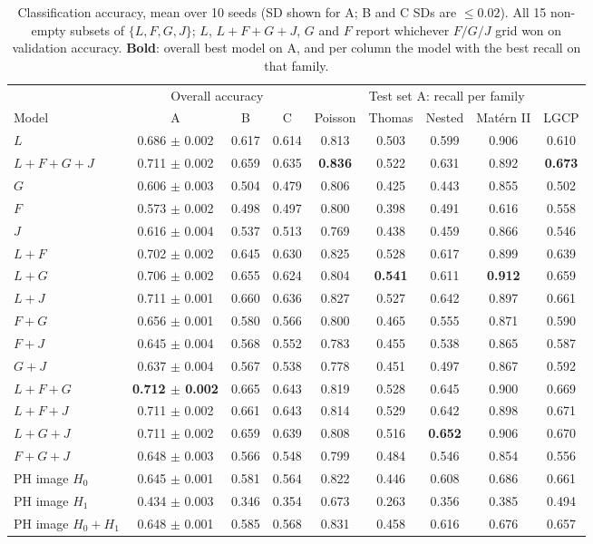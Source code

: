 \documentclass[10pt,a4paper]{article}
\newcommand{\B}[1]{\textbf{#1}}
\begin{document}
\begin{table}[ht]
\centering\footnotesize
\begin{tabular}{@{}l ccc ccccc@{}}
\toprule
 & \multicolumn{3}{c}{Overall accuracy} & \multicolumn{5}{c}{Test set A: recall per family}\\
\cmidrule(lr){2-4}\cmidrule(l){5-9}
Model & A & B & C & Poisson & Thomas & Nested & Mat\'ern II & LGCP\\
\midrule
$L$ & 0.686 $\pm$ 0.002 & 0.617 & 0.614 & 0.813 & 0.503 & 0.599 & 0.906 & 0.610\\
$L{+}F{+}G{+}J$ & 0.711 $\pm$ 0.002 & 0.659 & 0.635 & \B{0.836} & 0.522 & 0.631 & 0.892 & \B{0.673}\\
$G$ & 0.606 $\pm$ 0.003 & 0.504 & 0.479 & 0.806 & 0.425 & 0.443 & 0.855 & 0.502\\
$F$ & 0.573 $\pm$ 0.002 & 0.498 & 0.497 & 0.800 & 0.398 & 0.491 & 0.616 & 0.558\\
$J$ & 0.616 $\pm$ 0.004 & 0.537 & 0.513 & 0.769 & 0.438 & 0.459 & 0.866 & 0.546\\
$L{+}F$ & 0.702 $\pm$ 0.002 & 0.645 & 0.630 & 0.825 & 0.528 & 0.617 & 0.899 & 0.639\\
$L{+}G$ & 0.706 $\pm$ 0.002 & 0.655 & 0.624 & 0.804 & \B{0.541} & 0.611 & \B{0.912} & 0.659\\
$L{+}J$ & 0.711 $\pm$ 0.001 & 0.660 & 0.636 & 0.827 & 0.527 & 0.642 & 0.897 & 0.661\\
$F{+}G$ & 0.656 $\pm$ 0.001 & 0.580 & 0.566 & 0.800 & 0.465 & 0.555 & 0.871 & 0.590\\
$F{+}J$ & 0.645 $\pm$ 0.004 & 0.568 & 0.552 & 0.783 & 0.455 & 0.538 & 0.865 & 0.587\\
$G{+}J$ & 0.637 $\pm$ 0.004 & 0.567 & 0.538 & 0.778 & 0.451 & 0.497 & 0.867 & 0.592\\
\B{$L{+}F{+}G$} & \B{0.712 $\pm$ 0.002} & 0.665 & 0.643 & 0.819 & 0.528 & 0.645 & 0.900 & 0.669\\
$L{+}F{+}J$ & 0.711 $\pm$ 0.002 & 0.661 & 0.643 & 0.814 & 0.529 & 0.642 & 0.898 & 0.671\\
$L{+}G{+}J$ & 0.711 $\pm$ 0.002 & 0.659 & 0.639 & 0.808 & 0.516 & \B{0.652} & 0.906 & 0.670\\
$F{+}G{+}J$ & 0.648 $\pm$ 0.003 & 0.566 & 0.548 & 0.799 & 0.484 & 0.546 & 0.854 & 0.556\\
PH image $H_0$ & 0.645 $\pm$ 0.001 & 0.581 & 0.564 & 0.822 & 0.446 & 0.608 & 0.686 & 0.661\\
PH image $H_1$ & 0.434 $\pm$ 0.003 & 0.346 & 0.354 & 0.673 & 0.263 & 0.356 & 0.385 & 0.494\\
PH image $H_0{+}H_1$ & 0.648 $\pm$ 0.001 & 0.585 & 0.568 & 0.831 & 0.458 & 0.616 & 0.676 & 0.657\\
\bottomrule
\end{tabular}
\caption{Classification accuracy, mean over 10 seeds (SD shown for A; B and C SDs are $\le 0.02$). All 15 non-empty subsets of $\{L,F,G,J\}$; $L$, $L{+}F{+}G{+}J$, $G$ and $F$ report whichever $F/G/J$ grid won on validation accuracy. \textbf{Bold}: overall best model on A, and per column the model with the best recall on that family.}
\label{tab:classify}
\end{table}
\end{document}
